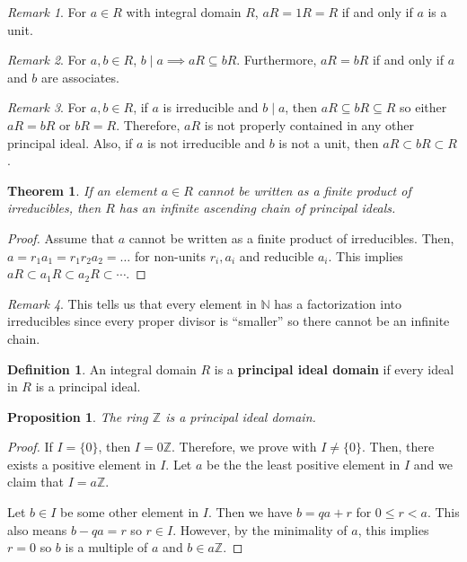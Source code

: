 \documentclass[
    parskip=half,
    toc=flat,
    toc=sectionentrydotfill,
]{scrartcl}  %
\theoremstyle{definition}
\newtheorem{definition}{Definition}[section]
\theoremstyle{plain}
\newtheorem{theorem}{Theorem}[definition]
\newtheorem{proposition}{Proposition}[definition]
\theoremstyle{remark}
\newtheorem{remark}{Remark}[definition]
\begin{document}
\begin{remark}
    For $a\in R$ with integral domain $R$, $aR=1R=R$ if and only if $a$ is a
    unit.
\end{remark}

\begin{remark}
    For $a,b\in R$, $b\mid a\implies aR\subseteq bR$.
    Furthermore, $aR=bR$ if and only if $a$ and $b$ are associates.
\end{remark}

\begin{remark}
    For $a,b\in R$, if $a$ is irreducible and $b\mid a$, then
    $aR\subseteq bR\subseteq R$ so either $aR=bR$ or $bR=R$.
    Therefore, $aR$ is not properly contained in any other principal ideal.
    Also, if $a$ is not irreducible and $b$ is not a unit, then
    $aR\subset bR\subset R$.
\end{remark}

\begin{theorem}
    If an element $a\in R$ cannot be written as a finite product of
    irreducibles, then $R$ has an infinite ascending chain of principal ideals.
\end{theorem}

\begin{proof}
    Assume that $a$ cannot be written as a finite product of irreducibles.
    Then, $a=r_1a_1=r_1r_2a_2=\dots$ for non-units $r_i,a_i$ and reducible $a_i$.
    This implies $aR\subset a_1R\subset a_2R\subset\cdots$.
\end{proof}

\begin{remark}
    This tells us that every element in $\mathbb{N}$ has a factorization into
    irreducibles since every proper divisor is ``smaller'' so there cannot be
    an infinite chain.
\end{remark}

\begin{definition}
    An integral domain $R$ is a \textbf{principal ideal domain} if every ideal
    in $R$ is a principal ideal.
\end{definition}

\begin{proposition}
    \label{thm:integers is principal ideal domain}
    The ring $\mathbb{Z}$ is a principal ideal domain.
\end{proposition}

\begin{proof}
    If $I=\{0\}$, then $I=0\mathbb{Z}$.
    Therefore, we prove with $I\neq\{0\}$.
    Then, there exists a positive element in $I$.
    Let $a$ be the the least positive element in $I$ and we claim that
    $I=a\mathbb{Z}$.

    Let $b\in I$ be some other element in $I$.
    Then we have $b = qa + r$ for $0\leq r<a$.
    This also means $b-qa=r$ so $r\in I$.
    However, by the minimality of $a$, this implies $r=0$ so $b$ is a multiple
    of $a$ and $b\in a\mathbb{Z}$.
\end{proof}
\end{document}
